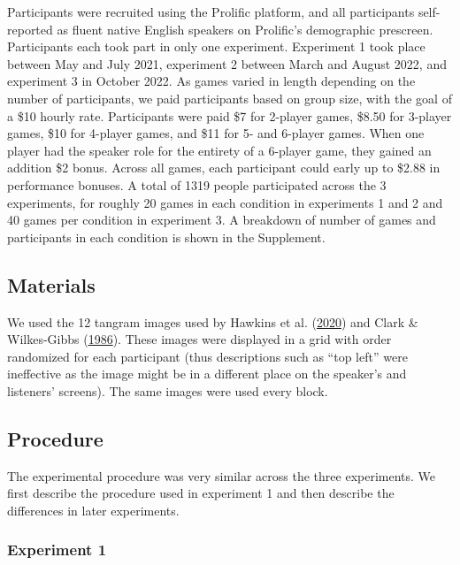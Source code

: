 \documentclass[
  english,
  a4paper,
]{article}
\begin{document}
Participants were recruited using the Prolific platform, and all participants self-reported as fluent native English speakers on Prolific's demographic prescreen. Participants each took part in only one experiment. Experiment 1 took place between May and July 2021, experiment 2 between March and August 2022, and experiment 3 in October 2022. As games varied in length depending on the number of participants, we paid participants based on group size, with the goal of a \$10 hourly rate. Participants were paid \$7 for 2-player games, \$8.50 for 3-player games, \$10 for 4-player games, and \$11 for 5- and 6-player games. When one player had the speaker role for the entirety of a 6-player game, they gained an addition \$2 bonus. Across all games, each participant could early up to \$2.88 in performance bonuses. A total of 1319 people participated across the 3 experiments, for roughly 20 games in each condition in experiments 1 and 2 and 40 games per condition in experiment 3. A breakdown of number of games and participants in each condition is shown in the Supplement.

\hypertarget{materials}{%
\subsection{Materials}\label{materials}}

We used the 12 tangram images used by Hawkins et al. (\protect\hyperlink{ref-hawkins2020}{2020}) and Clark \& Wilkes-Gibbs (\protect\hyperlink{ref-clark1986}{1986}). These images were displayed in a grid with order randomized for each participant (thus descriptions such as ``top left'' were ineffective as the image might be in a different place on the speaker's and listeners' screens). The same images were used every block.

\hypertarget{procedure}{%
\subsection{Procedure}\label{procedure}}

The experimental procedure was very similar across the three experiments. We first describe the procedure used in experiment 1 and then describe the differences in later experiments.

\hypertarget{experiment-1}{%
\subsubsection{Experiment 1}\label{experiment-1}}
\end{document}
